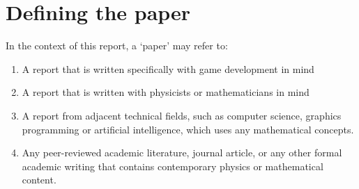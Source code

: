 \pagebreak

\section{Defining the paper}

In the context of this report, a `paper' may refer to:

\begin{enumerate}
    \item A report that is written specifically with game development in mind
    \item A report that is written with physicists or mathematicians in mind
    \item A report from adjacent technical fields, such as computer science, graphics programming or artificial intelligence, 
            which uses any mathematical concepts.
    \item Any peer-reviewed academic literature, journal article, or any other formal academic writing that contains contemporary physics or mathematical content.
\end{enumerate}